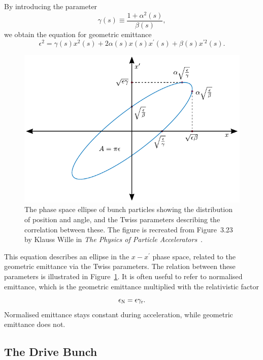 By introducing the parameter
\begin{equation}
    \gamma(s) \equiv \frac{1+\alpha^2(s)}{\beta(s)}, \label{EQ:TwissGamma}
\end{equation}
we obtain the equation for geometric emittance
\begin{equation}
    \epsilon^2 = \gamma(s)x^2(s) + 2\alpha(s)x(s)x^{\prime}(s) + \beta(s)x^{\prime 2}(s). \label{EQ:EmittFull}
\end{equation}

\begin{figure}[hbt]
    \centering
    \includegraphics[width=0.8\linewidth]{figures/Twiss}
    \caption{\label{Fig:BPI:Twiss}
        The phase space ellipse of bunch particles showing the distribution of position and angle, and the Twiss parameters describing the correlation between these.
        The figure is recreated from Figure~3.23 by Klauss Wille in \textit{The Physics of Particle Accelerators}~\cite{wille:2001}.
    }
\end{figure}

This equation describes an ellipse in the $x-x^\prime$ phase space, related to the geometric emittance via the Twiss parameters.
The relation between these parameters is illustrated in Figure~\ref{Fig:BPI:Twiss}.
It is often useful to refer to normalised emittance, which is the geometric emittance multiplied with the relativistic factor
\begin{equation}
    \epsilon_{\mathrm{N}} = \epsilon \gamma_{\mathrm{r}}. \label{EQ:NormEmit}
\end{equation}
Normalised emittance stays constant during acceleration, while geometric emittance does not.

\subsection{The Drive Bunch}
\label{Int:BPI:Drive}

